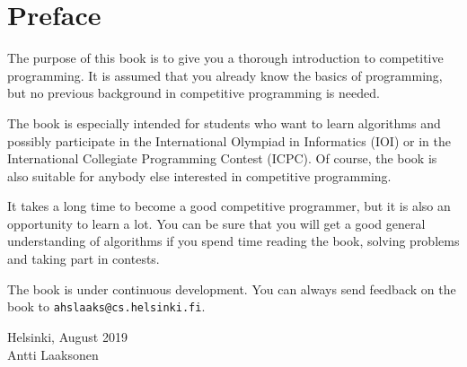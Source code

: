 \chapter*{Preface}

The purpose of this book is to give you
a thorough introduction to competitive programming.
It is assumed that you already
know the basics of programming, but no previous
background in competitive programming is needed.

The book is especially intended for
students who want to learn algorithms and
possibly participate in
the International Olympiad in Informatics (IOI) or
in the International Collegiate Programming Contest (ICPC).
Of course, the book is also suitable for 
anybody else interested in competitive programming.

It takes a long time to become a good competitive
programmer, but it is also an opportunity to learn a lot.
You can be sure that you will get
a good general understanding of algorithms
if you spend time reading the book,
solving problems and taking part in contests.

The book is under continuous development.
You can always send feedback on the book to
\texttt{ahslaaks@cs.helsinki.fi}.

\begin{flushright}
Helsinki, August 2019 \\
Antti Laaksonen
\end{flushright}
